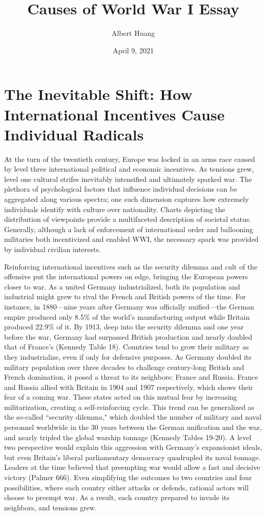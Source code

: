 \documentclass[letterpaper]{article}
\author{Albert Huang}
\date{April 9, 2021}
\title{Causes of World War I Essay}
\renewcommand\maketitle{}
\begin{document}
\maketitle
\setlength\parindent{0.5in}

\section{The Inevitable Shift: How International Incentives Cause Individual Radicals}
\label{sec:org3e97ecb}

At the turn of the twentieth century, Europe was locked in an arms race caused by level three international political and economic incentives. As tensions grew, level one cultural strifes inevitably intensified and ultimately sparked war.
The plethora of psychological factors that influence individual decisions can be aggregated along various spectra; one such dimension captures how extremely individuals identify with culture over nationality. Charts depicting the distribution of viewpoints provide a multifaceted description of societal status.
Generally, although a lack of enforcement of international order and ballooning militaries both incentivized and enabled WWI, the necessary spark was provided by individual civilian interests.

Reinforcing international incentives such as the security dilemma and cult of the offensive put the international powers on edge, bringing the European powers closer to war.
As a united Germany industrialized, both its population and industrial might grew to rival the French and British powers of the time. For instance, in 1880—nine years after Germany was officially unified—the German empire produced only 8.5\% of the world's manufacturing output while Britain produced 22.9\% of it. By 1913, deep into the security dilemma and one year before the war, Germany had surpassed British production and nearly doubled that of France's (Kennedy Table 18).
Countries tend to grow their military as they industrialize, even if only for defensive purposes. As Germany doubled its military population over three decades to challenge century-long British and French domination, it posed a threat to its neighbors: France and Russia. France and Russia allied with Britain in 1904 and 1907 respectively, which shows their fear of a coming war. These states acted on this mutual fear by increasing militarization, creating a self-reinforcing cycle.
This trend can be generalized as the so-called ``security dilemma," which doubled the number of military and naval personnel worldwide in the 30 years between the German unification and the war, and nearly tripled the global warship tonnage (Kennedy Tables 19-20). A level two perspective would explain this aggression with Germany's expansionist ideals, but even Britain's liberal parliamentary democracy quadrupled its naval tonnage.
Leaders at the time believed that preempting war would allow a fast and decisive victory (Palmer 666). Even simplifying the outcomes to two countries and four possibilities, where each country either attacks or defends, rational actors will choose to preempt war. As a result, each country prepared to invade its neighbors, and tensions grew.
\end{document}
